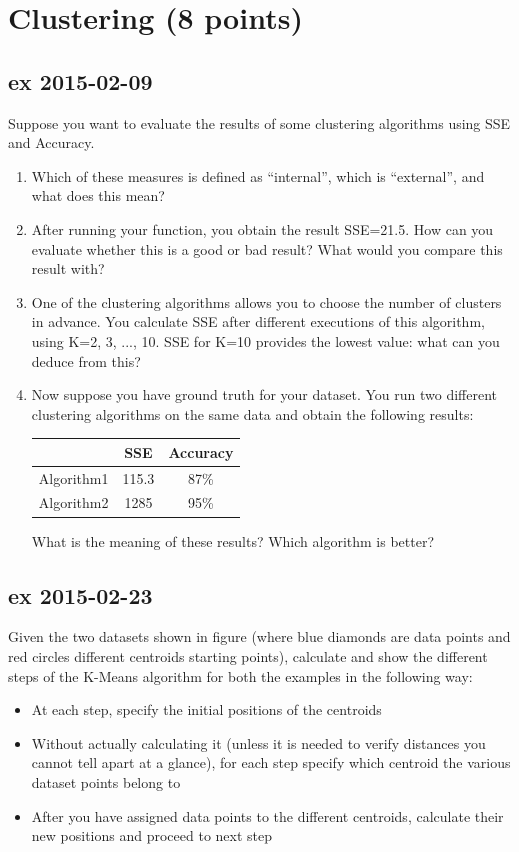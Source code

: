 \documentclass[a4paper,12pt,titlepage]{article} %
\begin{document}
\section{Clustering (8 points)}
\subsection{ex 2015-02-09}
Suppose you want to evaluate the results of some clustering algorithms using SSE and Accuracy.
\begin{enumerate}
\item Which of these measures is defined as “internal”, which is “external”, and what does this mean? 
\item After running your function, you obtain the result SSE=21.5. How can you evaluate whether this is a good or bad result? What would you compare this result with?
\item One of the clustering algorithms allows you to choose the number of clusters in advance. You calculate SSE after different executions of this algorithm, using K=2, 3, ..., 10. SSE for K=10 provides the lowest value: what can you deduce from this?
\item Now suppose you have ground truth for your dataset. You run two different clustering algorithms on the same data and obtain the following results:

\begin{center}
	\begin{tabular}{c|cc}
                & SSE & Accuracy\\
                \hline
                Algorithm1 & 115.3 & 87\% \\
                Algorithm2 & 1285 & 95\% \\
	\end{tabular}
\end{center}

What is the meaning of these results? Which algorithm is better?
\end{enumerate}

\subsection{ex 2015-02-23}
Given the two datasets shown in figure (where blue diamonds are data points and red circles different centroids starting points), calculate and show the different steps of the K-Means algorithm for both the examples in the following way:
\begin{itemize}
\item At each step, specify the initial positions of the centroids
\item Without actually calculating it (unless it is needed to verify distances you cannot tell apart at a glance), for each step specify which centroid the various dataset points belong to
\item After you have assigned data points to the different centroids, calculate their new positions and proceed to next step
\end{itemize}
\end{document}
